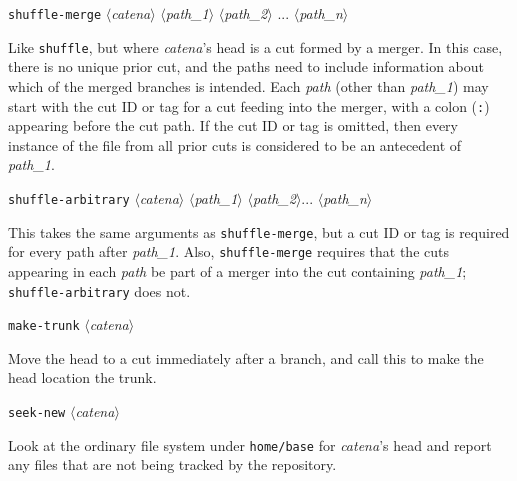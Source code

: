 \documentclass[10pt]{article}
\newcommand{\squote}[1]{{\tt\textquotesingle#1\textquotesingle}}
\newcommand{\itarg}[1]{\textit{$\langle$#1$\rangle$}}
\begin{document}
{{\tt shuffle-merge} \itarg{catena} \itarg{path\_1} \itarg{path\_2} ...
\itarg{path\_n} 
\begin{hang}
Like {\tt shuffle}, but where {\it catena}'s head is a cut formed by a
merger. In this case, there is no unique prior cut, and the paths need
to include information about which of the merged branches is
intended. Each {\it path} (other than {\it path\_1}) may start with the 
cut ID or tag for a cut feeding into the merger, with a colon
(\squote{:}) appearing before the cut path. If the cut ID or tag is
omitted, then every instance of the file from all prior cuts is
considered to be an antecedent of {\it path\_1}. 
\end{hang}
  
{\tt shuffle-arbitrary} \itarg{catena} \itarg{path\_1} \itarg{path\_2}...
\itarg{path\_n}
\begin{hang}
This takes the same arguments as {\tt shuffle-merge}, but a cut ID
or tag is required for every path after {\it path\_1}. Also, {\tt shuffle-merge}
requires that the cuts appearing in each {\it path} be part of a
merger into the cut containing {\it path\_1}; {\tt shuffle-arbitrary}
does not.
\end{hang}

{\tt make-trunk} \itarg{catena}
\begin{hang}
Move the head to a cut immediately after a branch, and call this to
make the head location the trunk.
\end{hang}

{\tt seek-new} \itarg{catena}
\begin{hang}
Look at the ordinary file system under {\tt home/base} for 
{\it catena}'s head and report any files that are not being tracked by
the repository.
\end{hang}


}
\end{document}
